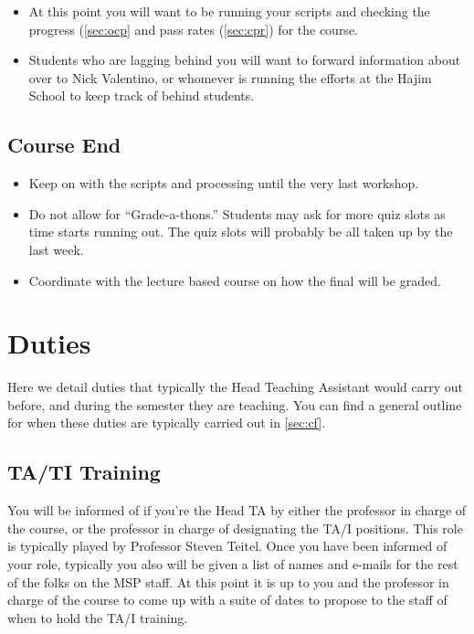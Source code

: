 \documentclass[12pt]{article}
\begin{document}
\begin{itemize}
	\item At this point you will want to be running your scripts and checking the progress (\ref{sec:ocp} and pass rates (\ref{sec:cpr}) for the course.
	\item Students who are lagging behind you will want to forward information about over to Nick Valentino, or whomever is running the efforts at the Hajim School to keep track of behind students. 
\end{itemize}

\subsection{Course End} \label{sec:ce}

\begin{itemize}
	\item Keep on with the scripts and processing until the very last workshop.
	\item Do not allow for ``Grade-a-thons.'' Students may ask for more quiz slots as time starts running out. The quiz slots will probably be all taken up by the last week.
	\item Coordinate with the lecture based course on how the final will be graded.
\end{itemize}


\section{Duties} \label{sec:duties}

\indent Here we detail duties that typically the Head Teaching Assistant would carry out before, and during the semester they are teaching. You can find a general outline for when these duties are typically carried out in \ref{sec:cf}.

\subsection{TA/TI Training} \label{sec:training}

\indent You will be informed of if you're the Head TA by either the professor in charge of the course, or the professor in charge of designating the TA/I positions. This role is typically played by Professor Steven Teitel. Once you have been informed of your role, typically you also will be given a list of names and e-mails for the rest of the folks on the MSP staff. At this point it is up to you and the professor in charge of the course to come up with a suite of dates to propose to the staff of when to hold the TA/I training.
\end{document}
